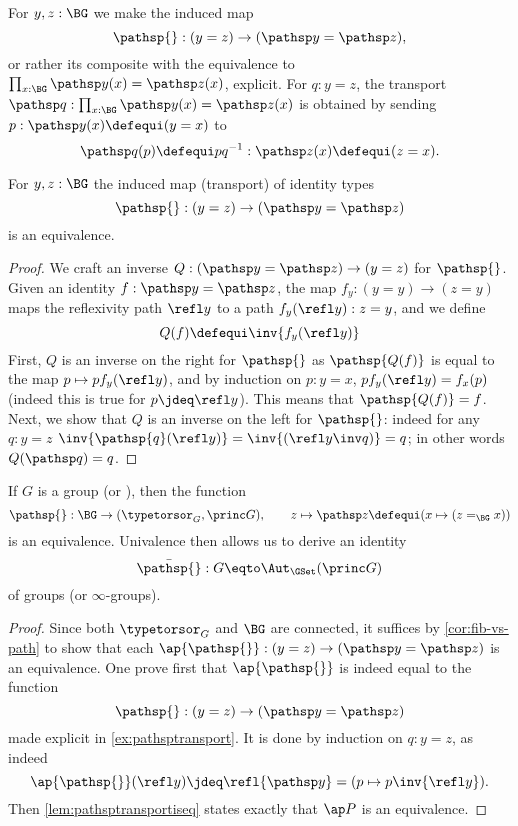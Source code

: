 \begin{example}\label{ex:pathsptransport}
  For $y,z:\BG$ we make the induced map
$$\pathsp{}:(y=z)\to (\pathsp y=\pathsp z),
$$
or rather its composite with the equivalence to $\prod_{x:\BG}\pathsp y(x)=\pathsp z(x)$,
explicit.
For $q:y=z$,  the transport
$\pathsp q:\prod_{x:\BG}\pathsp y(x)=\pathsp z(x)$
is obtained
by sending $p:\pathsp y(x)\defequi (y=x)$ to
$$\pathsp q(p)\defequi pq^{-1}:\pathsp z(x)\defequi(z=x).$$
\end{example}
\begin{lemma}\label{lem:pathsptransportiseq}
  For  $y,z:\BG$ the induced map  (\ie transport) of identity types
$$\pathsp{}:(y=z)\to (\pathsp y=\pathsp z)$$
is an equivalence.
\end{lemma}
\begin{proof}
  We craft an inverse $Q:(\pathsp y=\pathsp z) \to (y=z)$ for
  $\pathsp{}$. Given an identity $f:\pathsp y = \pathsp z$, the map
  $f_y: (y=y) \to (z=y)$ maps the reflexivity path $\refl y$ to a path
  $f_y(\refl y):z=y$, and we define
  \begin{displaymath}
    Q(f) \defequi \inv{f_y(\refl y)}
  \end{displaymath}
  First, $Q$ is an inverse on the right for $\pathsp{}$ as
  $\pathsp {Q(f)}$ is equal to the map $p \mapsto p f_y(\refl y)$, and
  by induction on $p:y=x$, $p f_y(\refl y) = f_x(p)$ (indeed this is
  true for $p\jdeq \refl y$). This means that $\pathsp {Q(f)} =
  f$. Next, we show that $Q$ is an inverse on the left for
  $\pathsp{}$: indeed for any $q:y=z$
  $\inv{\pathsp{q}(\refl y)} = \inv{(\refl y \inv q)} = q$; in other
  words $Q(\pathsp q)=q$.
\end{proof}


\begin{theorem}\label{lem:BGbytorsor}
  If $G$ is a group (or \inftygp), then the function
$$\pathsp{}:\BG\to(\typetorsor_G,\princ G),\qquad z\mapsto \pathsp z\defequi(x\mapsto(z=_{\BG}x))$$
is an equivalence.
Univalence then allows us to derive an identity
$$\bar{\pathsp{}}:G\eqto\Aut_{\GSet} (\princ G)$$
of groups (or $\infty$-groups).
\end{theorem}

\begin{proof}
  Since both $\typetorsor_G$ and $\BG$ are connected, it suffices by
  \cref{cor:fib-vs-path} to show that each
  $\ap {\pathsp{}}:(y=z)\to(\pathsp y=\pathsp z)$ is an
  equivalence. One prove first that $\ap {\pathsp{}}$ is indeed equal
  to the function
  $$\pathsp{}:(y=z)\to(\pathsp y= \pathsp z)$$
  made explicit in \cref{ex:pathsptransport}. It is done by induction
  on $q:y=z$, as indeed
  \begin{displaymath}
    \ap {\pathsp{}}(\refl y) \jdeq \refl {\pathsp y} = (p\mapsto p\inv{\refl y}).
  \end{displaymath}
  Then \cref{lem:pathsptransportiseq} states exactly that $\ap P$ is
  an equivalence.
\end{proof}

